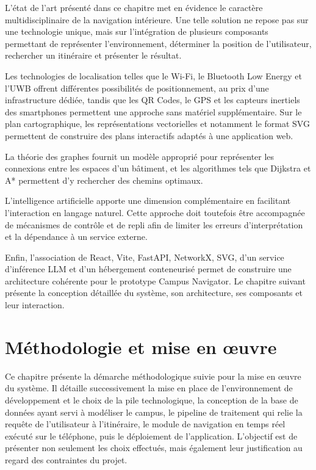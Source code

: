 \documentclass[12pt,a4paper]{report}
\begin{document}
L'état de l'art présenté dans ce chapitre met en évidence le caractère multidisciplinaire de la
navigation intérieure. Une telle solution ne repose pas sur une technologie unique, mais sur
l'intégration de plusieurs composants permettant de représenter l'environnement, déterminer la
position de l'utilisateur, rechercher un itinéraire et présenter le résultat.

Les technologies de localisation telles que le Wi-Fi, le Bluetooth Low Energy et l'UWB offrent
différentes possibilités de positionnement, au prix d'une infrastructure dédiée, tandis que les QR
Codes, le GPS et les capteurs inertiels des smartphones permettent une approche sans matériel
supplémentaire. Sur le plan cartographique, les représentations vectorielles et notamment le format
SVG permettent de construire des plans interactifs adaptés à une application web.

La théorie des graphes fournit un modèle approprié pour représenter les connexions entre les
espaces d'un bâtiment, et les algorithmes tels que Dijkstra et A* permettent d'y rechercher des
chemins optimaux.

L'intelligence artificielle apporte une dimension complémentaire en facilitant l'interaction en
langage naturel. Cette approche doit toutefois être accompagnée de mécanismes de contrôle et de
repli afin de limiter les erreurs d'interprétation et la dépendance à un service externe.

Enfin, l'association de React, Vite, FastAPI, NetworkX, SVG, d'un service d'inférence LLM et d'un
hébergement conteneurisé permet de construire une architecture cohérente pour le prototype
Campus Navigator. Le chapitre suivant présente la conception détaillée du système, son
architecture, ses composants et leur interaction.

\chapter{Méthodologie et mise en œuvre}

Ce chapitre présente la démarche méthodologique suivie pour la mise en œuvre du système. Il
détaille successivement la mise en place de l'environnement de développement et le choix de la
pile technologique, la conception de la base de données ayant servi à modéliser le campus, le
pipeline de traitement qui relie la requête de l'utilisateur à l'itinéraire, le module de
navigation en temps réel exécuté sur le téléphone, puis le déploiement de l'application.
L'objectif est de présenter non seulement les choix effectués, mais également leur justification
au regard des contraintes du projet.
\end{document}
